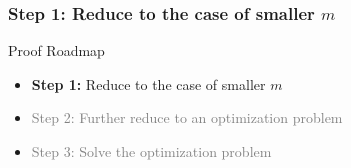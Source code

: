 \documentclass{beamer}
\begin{document}
\begin{frame}
  \frametitle{Step 1: Reduce to the case of smaller $m$}

  Proof Roadmap

  \begin{itemize}
    \item \textbf{Step 1:} Reduce to the case of smaller $m$
    \item \textcolor{gray}{Step 2: Further reduce to an optimization problem}
    \item \textcolor{gray}{Step 3: Solve the optimization problem}
  \end{itemize}
\end{frame}











\end{document}

